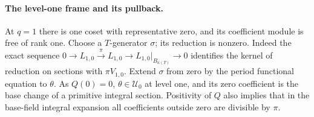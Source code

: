 \paragraph{The level-one frame and its pullback.}
At \(q=1\) there is one coset with representative zero, and its
coefficient module is free of rank one. Choose a \(T\)-generator
\(\sigma\); its reduction is nonzero. Indeed the exact sequence
\(
 0\longrightarrow L_{1,0}\xrightarrow{\pi}L_{1,0}
 \longrightarrow L_{1,0}|_{B_{\kappa(T)}}\longrightarrow0
\)
identifies the kernel of reduction on sections with
\(\pi V_{1,0}\). Extend \(\sigma\) from zero by the period
functional equation to \(\theta\). As \(Q(0)=0\),
\(\theta\in\mathcal U_0\) at level one, and its zero coefficient
is the base change of a primitive integral section. Positivity of
\(Q\) also implies that in the base-field integral expansion all
coefficients outside zero are divisible by \(\pi\).

